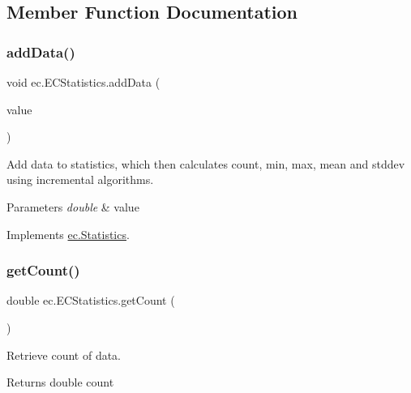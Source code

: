 \subsection{Member Function Documentation}
\mbox{\label{classec_1_1_e_c_statistics_a60feff78d1b3a0b548544d9cfbd6a051}} 
\subsubsection{\texorpdfstring{add\+Data()}{addData()}}
{\footnotesize\ttfamily void ec.\+E\+C\+Statistics.\+add\+Data (\begin{DoxyParamCaption}\item[{double}]{value }\end{DoxyParamCaption})}



Add data to statistics, which then calculates count, min, max, mean and stddev using incremental algorithms. 


\begin{DoxyParams}{Parameters}
{\em double} & value \\
\hline
\end{DoxyParams}


Implements \hyperlink{interfaceec_1_1_statistics_a8c59a234d776281dd7bd9fb05d0cb12e}{ec.\+Statistics}.

\mbox{\label{classec_1_1_e_c_statistics_abb7e2fa1c13cea018e3cf1e2a82309db}} 
\subsubsection{\texorpdfstring{get\+Count()}{getCount()}}
{\footnotesize\ttfamily double ec.\+E\+C\+Statistics.\+get\+Count (\begin{DoxyParamCaption}{ }\end{DoxyParamCaption})}



Retrieve count of data. 

\begin{DoxyReturn}{Returns}
double count 
\end{DoxyReturn}


